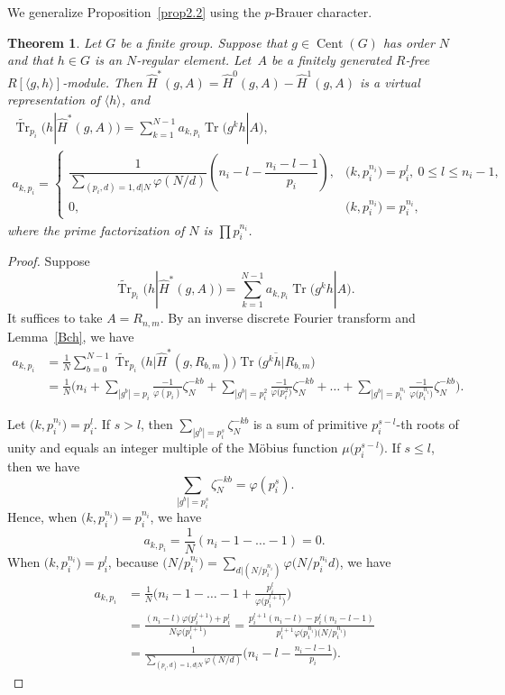 \documentclass[pdftex]{sigma}%
\numberwithin{equation}{section}
\newtheorem{Theorem}{Theorem}[section]
\begin{document}
We generalize Proposition~\ref{prop2.2} \cite[Proposition~2.2]{BR} using the $p$-Brauer character.

\begin{Theorem} \label{2.2kai}
Let $G$ be a finite group. Suppose that $g \in \operatorname{Cent}(G)$ has order $N$ and that $h \in G$ is an $N$-regular element. Let~$A$ be a finitely generated $R$-free $R[\langle g,h \rangle]$-module. Then $\hat{H}^*(g,A)=\hat{H}^0(g,A)-\hat{H}^1(g,A)$ is a virtual representation of $\langle h \rangle$, and
\begin{gather*}
\widetilde{\operatorname{Tr}}_{p_i}(h|\hat{H}^*(g,A))=\sum_{k=1}^{N-1}a_{k,p_i}\operatorname{Tr}\big(g^kh|A\big) ,
\\
a_{k,p_i}=\begin{cases}
\dfrac{1}{\sum_{(p_i,d)=1,d|N}\varphi (N/d)}\left(n_i-l-\dfrac{n_i-l-1}{p_i}\right), & \big(k,p_i^{n_i}\big)=p_i^l, \ 0\leq l \leq n_i-1, \\
0, & \big(k,p_i^{n_i}\big)=p_i^{n_i},
\end{cases}
\end{gather*}
where the prime factorization of $N$ is $\prod p_i^{n_i}$.
\end{Theorem}

\begin{proof}
Suppose
\[
\widetilde{\operatorname{Tr}}_{p_i}\big(h|\hat{H}^*(g,A)\big)=\sum_{k=1}^{N-1}a_{k,p_i}\operatorname{Tr}\big(g^kh|A\big). \]
It suffices to take $A=R_{n,m}$.
By an inverse discrete Fourier transform and Lemma~\ref{Bch}, we have
\begin{align*}
a_{k,p_i}&=\frac{1}{N}\sum_{b=0}^{N-1}\widetilde{\operatorname{Tr}}_{p_i}\big(h|\hat{H}^*(g,R_{b,m})\big)\overline{\operatorname{Tr}\big(g^kh|R_{b,m}\big)} \\
 &=\frac{1}{N}\Bigg(n_i+\sum_{|g^b|=p_i} \frac{-1}{\varphi (p_i)}\zeta_N^{-kb}+\sum_{ |g^b|=p_i^2} \frac{-1}{\varphi \big(p_i^2\big)}\zeta_N^{-kb}+\dots+\sum_{|g^b|=p_i^{n_i}} \frac{-1}{\varphi \big(p_i^{n_i}\big)}\zeta_N^{-kb}\Bigg).
\end{align*}

Let $\big(k,p_i^{n_i}\big)=p_i^l$. If $s>l$, then $\sum_{|g^b|=p_i^s}\zeta_N^{-kb}$ is a sum of primitive $p_i^{s-l}$-th roots of unity and equals an integer multiple of the M\"obius function $\mu\big(p_i^{s-l}\big)$. If $s\leq l$, then we have
\[
\sum_{|g^b|=p_i^s}\zeta_N^{-kb}=\varphi(p_i^s).
\]
Hence, when $\big(k,p_i^{n_i}\big)=p_i^{n_i}$, we have 
\[ a_{k,p_i}=\frac{1}{N}(n_i-1-\dots-1)=0.\]
When $\big(k,p_i^{n_i}\big)=p_i^{l}$, because $\big(N/p_i^{n_i}\big)=\sum_{d|(N/p_i^{n_i})}\varphi\big(N/p_i^{n_i}d\big)$, we have
\begin{align*}
a_{k,p_i}&=\frac{1}{N}\Bigg(n_i-1-\dots-1+\frac{p_i^l}{\varphi \big(p_i^{l+1}\big)}\Bigg)\\
 &=\frac{(n_i-l)\varphi \big(p_i^{l+1}\big)+p_i^l}{N\varphi \big(p_i^{l+1}\big)} =\frac{p_i^{l+1}(n_i-l)-p_i^l(n_i-l-1)}{p_i^{l+1}\varphi\big(p_i^{n_i}\big)\big(N/p_i^{n_i}\big)}\\
 &=\frac{1}{\sum_{(p_i,d)=1,d|N}\varphi (N/d)}\bigg(n_i-l-\frac{n_i-l-1}{p_i}\bigg).\tag*{\qed}
\end{align*}\renewcommand{\qed}{}
\end{proof}
\end{document}
